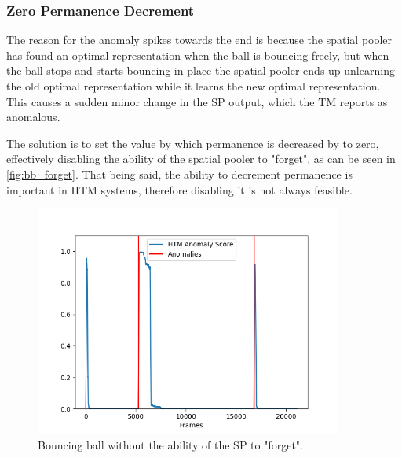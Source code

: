 \subsubsection{Zero Permanence Decrement}
The reason for the anomaly spikes towards the end is because the spatial pooler has found an optimal representation when the ball is bouncing freely, but when the ball stops and starts bouncing in-place the spatial pooler ends up unlearning the old optimal representation while it learns the new optimal representation. This causes a sudden minor change in the SP output, which the TM reports as anomalous.
\par
The solution is to set the value by which permanence is decreased by to zero, effectively disabling the ability of the spatial pooler to "forget", as can be seen in \autoref{fig:bb_forget}. That being said, the ability to decrement permanence is important in HTM systems, therefore disabling it is not always feasible.
\begin{figure}[H]
    \centering
    \includegraphics[width=0.9\textwidth]{resources/experiments/bouncing_ball/bb_anoms_unforgetting.png}
    \caption[Bouncing Ball Experiment Anomaly Score Zero Decrement]{Bouncing ball without the ability of the SP to "forget".}
    \label{fig:bb_forget}
\end{figure}
